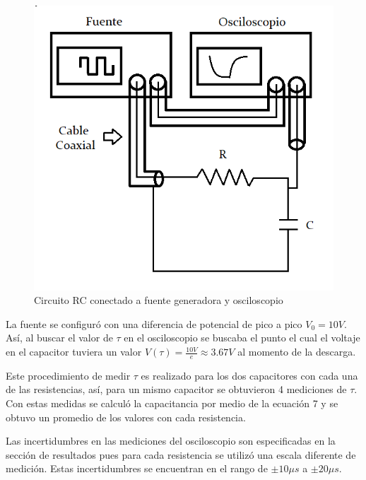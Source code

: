 \documentclass[10pt,letter]{article}
\begin{document}
\begin{multicols}{2}
\begin{figure}[H]
\centering
\includegraphics[scale=0.4]{Circuito}
\caption{Circuito RC conectado a fuente generadora y osciloscopio}
\label{RCcarga}
\end{figure}


La fuente se configuró con una diferencia de potencial de pico a pico $V_0=10V$. Así, al buscar el valor de $\tau$ en el osciloscopio se buscaba el punto el cual el voltaje en el capacitor tuviera un valor $V(\tau)=\frac{10V}{e}\approx3.67V$ al momento de la descarga.

\vspace{0.2cm}

Este procedimiento de medir $\tau$ es realizado para los dos capacitores con cada una de las resistencias, así, para un mismo capacitor se obtuvieron 4 mediciones de $\tau$. Con estas medidas se calculó la capacitancia por medio de la ecuación 7 y se obtuvo un promedio de los valores con cada resistencia. 

\vspace{0.2cm}

Las incertidumbres en las mediciones del osciloscopio son especificadas en la sección de resultados pues para cada resistencia se utilizó una escala diferente de medición. Estas incertidumbres se encuentran en el rango de $\pm 10\mu s$ a $\pm 20 \mu s$.



\end{multicols}
\end{document}
